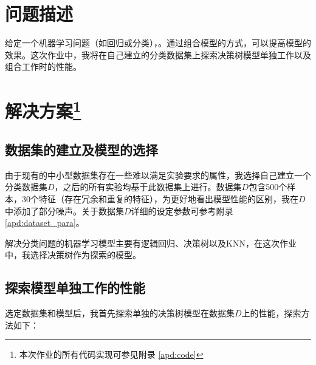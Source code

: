 \documentclass[12pt,a4paper]{article}
\theoremstyle{definition}
\begin{document}
\noindent
\noindent{}

\section{问题描述}

给定一个机器学习问题（如回归或分类），。通过组合模型的方式，可以提高模型的效果。这次作业中，我将在自己建立的分类数据集上探索决策树模型单独工作以及组合工作时的性能。

\section{解决方案\protect\footnote{本次作业的所有代码实现可参见附录 \ref{apd:code}}}

\subsection{数据集的建立及模型的选择}

由于现有的中小型数据集存在一些难以满足实验要求的属性，我选择自己建立一个分类数据集$D$，之后的所有实验均基于此数据集上进行。数据集$D$包含500个样本，30个特征（存在冗余和重复的特征），为更好地看出模型性能的区别，我在$D$中添加了部分噪声。关于数据集$D$详细的设定参数可参考附录 \ref{apd:dataset_para}。

解决分类问题的机器学习模型主要有逻辑回归、决策树以及KNN，在这次作业中，我选择决策树作为探索的模型。

\subsection{探索模型单独工作的性能}

选定数据集和模型后，我首先探索单独的决策树模型在数据集$D$上的性能，探索方法如下：
\end{document}

